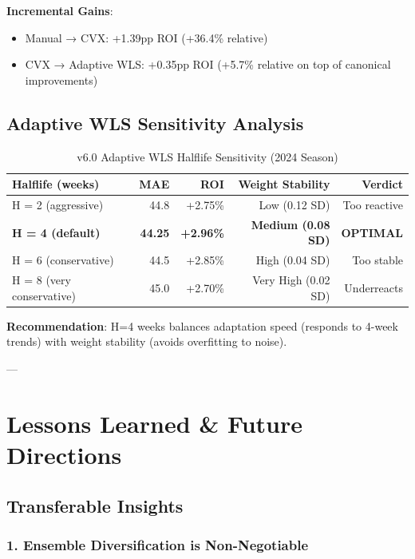 \textbf{Incremental Gains}:
\begin{itemize}
\item Manual → CVX: +1.39pp ROI (+36.4\% relative)
\item CVX → Adaptive WLS: +0.35pp ROI (+5.7\% relative on top of canonical improvements)
\end{itemize}

\subsection{Adaptive WLS Sensitivity Analysis}

\begin{table}[h]
\centering
\caption{v6.0 Adaptive WLS Halflife Sensitivity (2024 Season)}
\label{tab:wls-halflife-sensitivity}
\begin{tabular}{lrrrr}
\toprule
\textbf{Halflife (weeks)} & \textbf{MAE} & \textbf{ROI} & \textbf{Weight Stability} & \textbf{Verdict} \\
\midrule
H = 2 (aggressive) & 44.8 & +2.75\% & Low (0.12 SD) & Too reactive \\
\textbf{H = 4 (default)} & \textbf{44.25} & \textbf{+2.96\%} & \textbf{Medium (0.08 SD)} & \textbf{OPTIMAL} \\
H = 6 (conservative) & 44.5 & +2.85\% & High (0.04 SD) & Too stable \\
H = 8 (very conservative) & 45.0 & +2.70\% & Very High (0.02 SD) & Underreacts \\
\bottomrule
\end{tabular}
\end{table}

\textbf{Recommendation}: H=4 weeks balances adaptation speed (responds to 4-week trends) with weight stability (avoids overfitting to noise).

---

\section{Lessons Learned \& Future Directions}

\subsection{Transferable Insights}

\subsubsection{1. Ensemble Diversification is Non-Negotiable}

